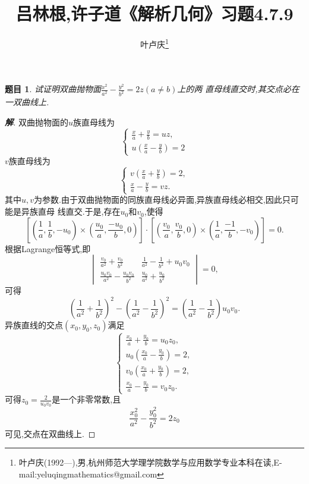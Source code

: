 \documentclass[a4paper]{article}
\newtheorem*{exe}{题目}
\newenvironment{exercise}
{\bigskip\begin{mdframed}\begin{exe}}
    {\end{exe}\end{mdframed}\bigskip}
\begin{document}
\title{\huge{\bf{吕林根,许子道《解析几何》习题4.7.9}}} \author{\small{叶卢庆\footnote{叶卢庆(1992---),男,杭州师范大学理学院数学与应用数学专业本科在读,E-mail:yeluqingmathematics@gmail.com}}}
\maketitle
\begin{exercise}
  试证明双曲抛物面$\frac{x^2}{a^2}-\frac{y^2}{b^2}=2z(a\neq b)$上的两
  直母线直交时,其交点必在一双曲线上.
\end{exercise}
\begin{proof}[\textbf{解}]
双曲抛物面的$u$族直母线为
$$
\begin{cases}
  \frac{x}{a}+\frac{y}{b}=uz,\\
u(\frac{x}{a}-\frac{y}{b})=2
\end{cases}
$$
$v$族直母线为
$$
\begin{cases}
v(\frac{x}{a}+\frac{y}{b})=2,\\
\frac{x}{a}-\frac{y}{b}=vz.
\end{cases}
$$
其中$u,v$为参数.由于双曲抛物面的同族直母线必异面,异族直母线必相交,因此只可能是异族直母
线直交.于是,存在$u_0$和$v_0$,使得
$$
\left[\left(\frac{1}{a},\frac{1}{b},-u_0\right)\times
  \left(\frac{u_0}{a},\frac{-u_0}{b},0\right)\right]\cdot \left[\left(\frac{v_0}{a},\frac{v_{0}}{b},0\right)\times
  \left(\frac{1}{a},\frac{-1}{b},-v_0\right)\right]=0.
$$
根据Lagrange恒等式,即
$$
\begin{vmatrix}
  \frac{v_0}{a^2}+\frac{v_0}{b^2}&\frac{1}{a^{2}}-\frac{1}{b^2}+u_0v_0\\
\frac{u_0v_0}{a^2}-\frac{u_0v_0}{b^2}&\frac{u_0}{a^2}+\frac{u_0}{b^2}
\end{vmatrix}=0,
$$
可得
$$
\left(\frac{1}{a^2}+\frac{1}{b^2}\right)^2-\left(\frac{1}{a^2}-\frac{1}{b^2}\right)^2=\left(\frac{1}{a^2}-\frac{1}{b^2}\right)u_0v_0.
$$
异族直线的交点$(x_0,y_0,z_0)$满足
$$
\begin{cases}
  \frac{x_{0}}{a}+\frac{y_{0}}{b}=u_{0}z_0,\\
u_{0}(\frac{x_{0}}{a}-\frac{y_{0}}{b})=2,\\
v_{0}(\frac{x_{0}}{a}+\frac{y_{0}}{b})=2,\\
\frac{x_{0}}{a}-\frac{y_{0}}{b}=v_{0}z_{0}.
\end{cases}
$$
可得$z_0=\frac{2}{u_0v_0}$是一个非零常数,且
$$
\frac{x_0^2}{a^2}-\frac{y_0^2}{b^2}=2z_0
$$
可见,交点在双曲线上.
\end{proof}
\end{document}
